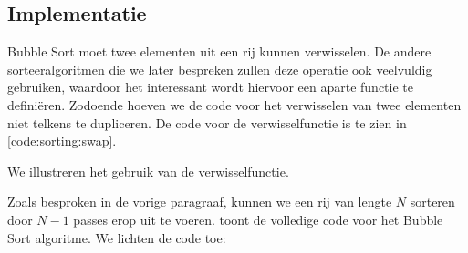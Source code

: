 \subsection{Implementatie} \label{sec:sorteren:bubble-sort:implementatie}
Bubble Sort moet twee elementen uit een rij kunnen verwisselen.
De andere sorteeralgoritmen die we later bespreken zullen
deze operatie ook veelvuldig gebruiken, waardoor het interessant wordt hiervoor een aparte functie te
defini\"eren. Zodoende hoeven we de code voor het verwisselen van twee elementen niet telkens te dupliceren.
De code voor de verwisselfunctie is te zien in \cref{code:sorting:swap}.


\begin{example}
We illustreren het gebruik van de verwisselfunctie.
\end{example}


Zoals besproken in de vorige paragraaf, kunnen we een rij van lengte $N$ sorteren door
$N - 1$ passes erop uit te voeren.
 toont de volledige code voor het Bubble Sort algoritme. We lichten de code toe:

